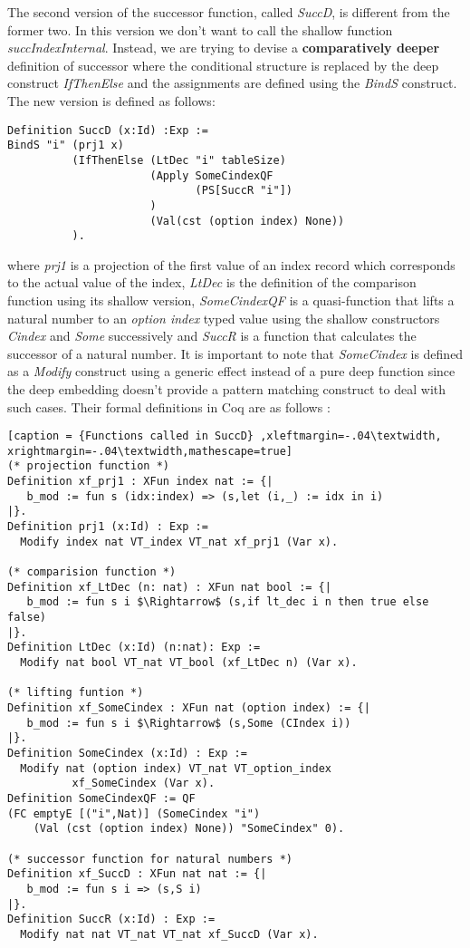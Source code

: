 The second version of the successor function, called \textit{SuccD}, is different from the former two. In this version we don't want to call the shallow function \textit{succIndexInternal}. Instead, we are trying to devise a \textbf{comparatively deeper} definition of successor where the conditional structure is replaced by the deep construct \textit{IfThenElse} and the assignments are defined using the \textit{BindS} construct. The new version is defined as follows: 
\begin{lstlisting}[caption = {Definition of SuccD}]
Definition SuccD (x:Id) :Exp :=
BindS "i" (prj1 x) 
          (IfThenElse (LtDec "i" tableSize) 
                      (Apply SomeCindexQF
                             (PS[SuccR "i"])
                      ) 
                      (Val(cst (option index) None))
          ).
\end{lstlisting} \vspace{4pt}
where \textit{prj1} is a projection of the first value of an index record which corresponds to the actual value of the index, \textit{LtDec} is the definition of the comparison function using its shallow version, \textit{SomeCindexQF} is a quasi-function that lifts a natural number to an \textit{option index} typed value using the shallow constructors \textit{Cindex} and \textit{Some} successively and \textit{SuccR} is a function that calculates the successor of a natural number. It is important to note that \textit{SomeCindex} is defined as a \textit{Modify} construct using a generic effect instead of a pure deep function since the deep embedding doesn’t provide a pattern matching construct to deal with such cases. Their formal definitions in Coq are as follows :  
\begin{lstlisting}[caption = {Functions called in SuccD} ,xleftmargin=-.04\textwidth,
xrightmargin=-.04\textwidth,mathescape=true]
(* projection function *)
Definition xf_prj1 : XFun index nat := {|
   b_mod := fun s (idx:index) => (s,let (i,_) := idx in i)
|}.
Definition prj1 (x:Id) : Exp :=
  Modify index nat VT_index VT_nat xf_prj1 (Var x). 
  
(* comparision function *)
Definition xf_LtDec (n: nat) : XFun nat bool := {|
   b_mod := fun s i $\Rightarrow$ (s,if lt_dec i n then true else false)
|}.
Definition LtDec (x:Id) (n:nat): Exp :=
  Modify nat bool VT_nat VT_bool (xf_LtDec n) (Var x). 

(* lifting funtion *)
Definition xf_SomeCindex : XFun nat (option index) := {|
   b_mod := fun s i $\Rightarrow$ (s,Some (CIndex i))
|}.
Definition SomeCindex (x:Id) : Exp :=
  Modify nat (option index) VT_nat VT_option_index  
  	      xf_SomeCindex (Var x).
Definition SomeCindexQF := QF 
(FC emptyE [("i",Nat)] (SomeCindex "i") 
    (Val (cst (option index) None)) "SomeCindex" 0).

(* successor function for natural numbers *)
Definition xf_SuccD : XFun nat nat := {|
   b_mod := fun s i => (s,S i)
|}.
Definition SuccR (x:Id) : Exp :=
  Modify nat nat VT_nat VT_nat xf_SuccD (Var x).
\end{lstlisting} \vspace{4pt} 

